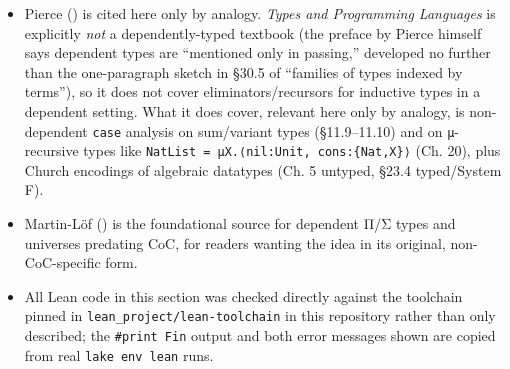 \begin{itemize}
\item
  Pierce (\cite{Pierce2002}) is cited here only by analogy. \emph{Types and Programming Languages} is explicitly \emph{not} a dependently-typed textbook (the preface by Pierce himself says dependent types are ``mentioned only in passing,'' developed no further than the one-paragraph sketch in §30.5 of ``families of types indexed by terms''), so it does not cover eliminators/recursors for inductive types in a dependent setting. What it does cover, relevant here only by analogy, is non-dependent \texttt{case} analysis on sum/variant types (§11.9--11.10) and on \texttt{µ}-recursive types like \texttt{NatList = μX.⟨nil:Unit, cons:\{Nat,X\}⟩} (Ch. 20), plus Church encodings of algebraic datatypes (Ch. 5 untyped, §23.4 typed/System F).
\item
  Martin-Löf (\cite{MartinLof1984}) is the foundational source for dependent Π/Σ types and universes predating CoC, for readers wanting the idea in its original, non-CoC-specific form.
\item
  All Lean code in this section was checked directly against the toolchain pinned in \texttt{lean\_\allowbreak{}project/\allowbreak{}lean-\allowbreak{}toolchain} in this repository rather than only described; the \texttt{\#print Fin} output and both error messages shown are copied from real \texttt{lake env lean} runs.
\end{itemize}
